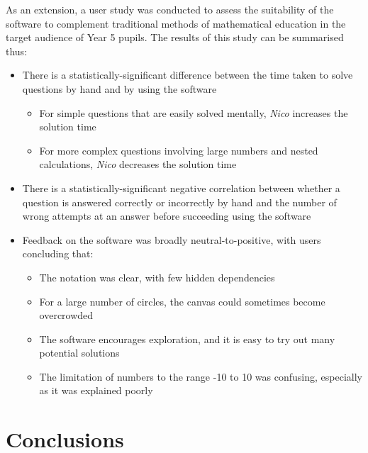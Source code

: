 \documentclass[12pt,twoside,notitlepage,xetex]{report}
\begin{document}
As an extension, a user study was conducted to assess the suitability of the software to complement traditional methods of mathematical education in the target audience of Year 5 pupils.  The results of this study can be summarised thus:
\begin{itemize}
\item There is a statistically-significant difference between the time taken to solve questions by hand and by using the software
\begin{itemize}
\item For simple questions that are easily solved mentally, \emph{Nico} increases the solution time
\item For more complex questions involving large numbers and nested calculations, \emph{Nico} decreases the solution time
\end{itemize}
\item There is a statistically-significant negative correlation between whether a question is answered correctly or incorrectly by hand and the number of wrong attempts at an answer before succeeding using the software
\item Feedback on the software was broadly neutral-to-positive, with users concluding that:
\begin{itemize}
\item The notation was clear, with few hidden dependencies
\item For a large number of circles, the canvas could sometimes become overcrowded
\item The software encourages exploration, and it is easy to try out many potential solutions
\item The limitation of numbers to the range -10 to 10 was confusing, especially as it was explained poorly
\end{itemize}
\end{itemize}


\cleardoublepage
\chapter{Conclusions}





\cleardoublepage

\end{document}
